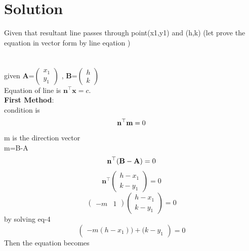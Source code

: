 \documentclass[journal,12pt,twocolumn]{IEEEtran}
\newcommand{\myvec}[1]{\ensuremath{\begin{pmatrix}#1\end{pmatrix}}}
\let\vec\mathbf
\begin{document}
\section{Solution}
Given that resultant line passes through point(x1,y1) and (h,k) (let prove the equation in vector form by line eqation ) \\
\\
\\
given ${\vec{A}}$=$\myvec{
  x_1\\
  y_1}$
 , ${\vec{B}}$=$\myvec{
  h\\
  k}$
\\

Equation of line is  ${\vec{n^{\top}}\vec{x}} = c$.\\

\textbf{First Method}:\\
condition is	
\begin{equation}
	{\vec{n^{\top}}\vec{{m}}} = 0 \\     \label{eq-1}
\end{equation}	
m is the direction vector\\
		 m=B-A\\
\begin{equation}
	 {\vec{n^{\top}}\vec{({B-A})}} = 0\\     \label{eq-2}
\end{equation}
\begin{equation}
	\vec{n^{\top}}
	\myvec{
  h-x_1\\
  k-y_1
  }
   = 0  \label{eq-3}
\end{equation}
\begin{equation}
 			\myvec{
					-m& 1}\myvec{
  h-x_1\\
  k-y_1
  }
   = 0  \label{eq-4}
\end{equation}
by solving eq-4
\begin{equation}
	\myvec{
 -m (h-x_1))+(k-y_1}=0
\end{equation}
Then the equation becomes\\
\end{document}
